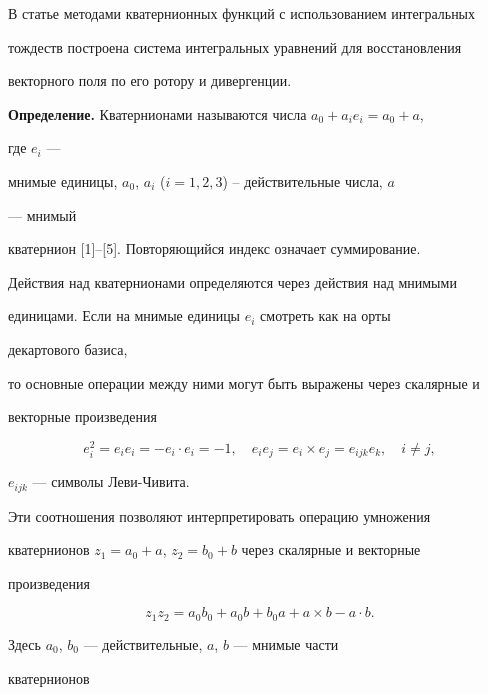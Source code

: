 В статье методами кватернионных функций с использованием интегральных  


тождеств построена система интегральных уравнений для восстановления  


векторного поля по его ротору и дивергенции. 


\medskip 


 


{\bf Определение.} Кватернионами называются числа $a_0+a_i e_i=a_0+a$, 


где $e_i$ --- 


мнимые единицы, $a_0$, $a_i$ ($i=1,2,3$) -- действительные числа, $a$ 


--- мнимый 


кватернион [1]--[5]. Повторяющийся индекс означает суммирование. 


\medskip 


 


Действия над кватернионами определяются через действия над мнимыми  


единицами. Если на мнимые единицы $e_i$ смотреть как на орты 


декартового базиса, 


то основные операции между ними могут быть выражены через скалярные и  


векторные произведения 


$$ 


e^2_i=e_i e_i=-e_i\cdot e_i=-1,\quad e_i e_j=e_i\times e_j= 


e_{ijk}e_k,\quad i\ne j, 


$$ 


$e_{ijk}$ --- символы Леви-Чивита. 


 


Эти соотношения позволяют интерпретировать операцию умножения 


кватернионов $z_1=a_0+a$, $z_2=b_0+b$ через скалярные и векторные 


произведения


\begin{equation} 


z_1z_2=a_0b_0+a_0b+b_0a+a\times b-a\cdot b. 


\end{equation} 


Здесь $a_0$, $b_0$ --- действительные, $a$, $b$ --- мнимые части 


кватернионов 


